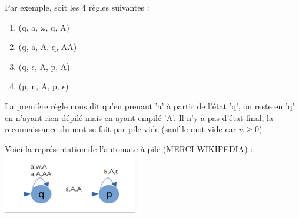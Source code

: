 \documentclass{article}
\begin{document}
    Par exemple, soit les 4 règles suivantes :
    \begin{enumerate}
        \item (q, a, $\omega$, q, A)
        \item (q, a, A, q, AA)
        \item (q, $\epsilon$, A, p, A)
        \item (p, n, A, p, $\epsilon$)
    \end{enumerate}
    
    La première règle nous dit qu'en prenant 'a' à partir de l'état 'q', on reste en 'q' en n'ayant rien dépilé
    mais en ayant empilé 'A'.
    Il n'y a pas d'état final, la reconnaissance du mot se fait par pile vide (sauf le mot vide car $n\geq0$)

    Voici la représentation de l'automate à pile (MERCI WIKIPEDIA) :\\
    
    \includegraphics[width=\textwidth]{images/question1_automate.PNG}
\end{document}
